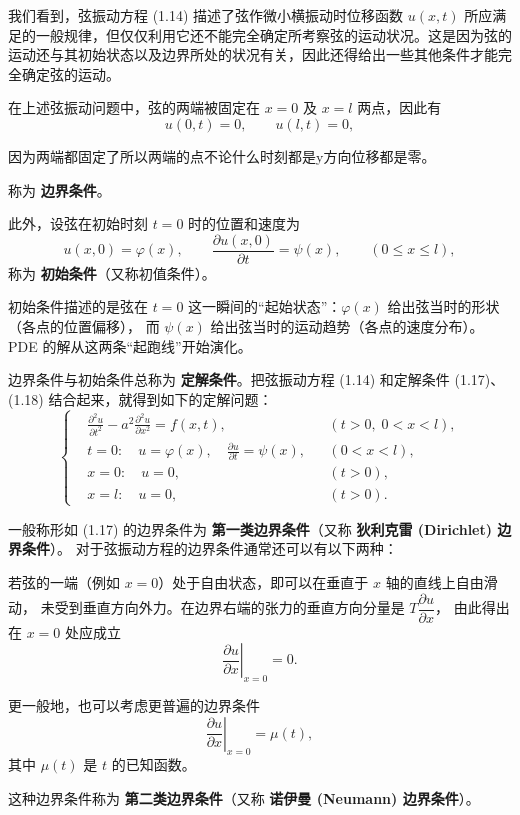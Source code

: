 我们看到，弦振动方程 (1.14) 描述了弦作微小横振动时位移函数 $u(x,t)$ 所应满足的一般规律，但仅仅利用它还不能完全确定所考察弦的运动状况。这是因为弦的运动还与其初始状态以及边界所处的状况有关，因此还得给出一些其他条件才能完全确定弦的运动。

在上述弦振动问题中，弦的两端被固定在 $x=0$ 及 $x=l$ 两点，因此有
\[
u(0,t) = 0, \qquad u(l,t) = 0, \tag{1.17}
\]
\begin{dxtips}
    因为两端都固定了所以两端的点不论什么时刻都是y方向位移都是零。
\end{dxtips}
称为 \textbf{边界条件}。

此外，设弦在初始时刻 $t=0$ 时的位置和速度为
\[
u(x,0) = \varphi(x), \qquad \frac{\partial u(x,0)}{\partial t} = \psi(x), \qquad (0 \leq x \leq l), \tag{1.18}
\]
称为 \textbf{初始条件}（又称初值条件）。
\begin{dxtips}
    初始条件描述的是弦在 $t=0$ 这一瞬间的“起始状态”：$\varphi(x)$ 给出弦当时的形状（各点的位置偏移），
    而 $\psi(x)$ 给出弦当时的运动趋势（各点的速度分布）。
    PDE 的解从这两条“起跑线”开始演化。
\end{dxtips}
边界条件与初始条件总称为 \textbf{定解条件}。把弦振动方程 (1.14) 和定解条件 (1.17)、(1.18) 结合起来，就得到如下的定解问题：
\begin{equation}
\left\{
\begin{aligned}
  &\frac{\partial^2 u}{\partial t^2} - a^2 \frac{\partial^2 u}{\partial x^2} = f(x,t),
  && (t > 0,\; 0 < x < l),  \\
  &t = 0: \quad u = \varphi(x), \quad \frac{\partial u}{\partial t} = \psi(x),
  && (0 < x < l),  \\
  &x = 0: \quad u = 0,
  && (t > 0),  \\
  &x = l: \quad u = 0,
  && (t > 0). 
\end{aligned}
\right.
\end{equation}
\begin{definition}[第一类边界条件]
一般称形如 (1.17) 的边界条件为 \textbf{第一类边界条件}（又称
\textbf{狄利克雷 (Dirichlet) 边界条件}）。
对于弦振动方程的边界条件通常还可以有以下两种：
\end{definition}
\begin{definition}[第二类边界条件]
若弦的一端（例如 $x=0$）处于自由状态，即可以在垂直于 $x$ 轴的直线上自由滑动，
未受到垂直方向外力。在边界右端的张力的垂直方向分量是 $T \dfrac{\partial u}{\partial x}$，
由此得出在 $x=0$ 处应成立
\[
  \left.\frac{\partial u}{\partial x}\right|_{x=0} = 0.
\]

更一般地，也可以考虑更普遍的边界条件
\[
  \left.\frac{\partial u}{\partial x}\right|_{x=0} = \mu(t),
\]
其中 $\mu(t)$ 是 $t$ 的已知函数。

这种边界条件称为 \textbf{第二类边界条件}（又称 \textbf{诺伊曼 (Neumann) 边界条件}）。
\end{definition}
